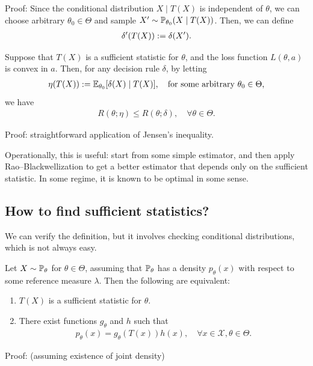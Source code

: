 \documentclass[11pt,letterpaper]{article}
\numberwithin{theorem}{lecture}
\numberwithin{proposition}{lecture}
\numberwithin{lemma}{lecture}
\numberwithin{claim}{lecture}
\numberwithin{corollary}{lecture}
\numberwithin{definition}{lecture}
\numberwithin{conjecture}{lecture}
\numberwithin{remark}{lecture}
\numberwithin{example}{lecture}
\numberwithin{equation}{lecture}
\begin{document}
Proof: Since the conditional distribution $X \mid T (X)$ is independent of $\theta$, we can choose arbitrary $\theta_0 \in \Theta$ and sample $X' \sim {\mathbb{P}}_{\theta_0} (X \mid T(X))$. Then, we can define
\begin{align*}
  \delta' (T(X)) := \delta (X').
\end{align*}
\begin{theorem}
  Suppose that $T(X)$ is a sufficient statistic for $\theta$, and the loss function $L(\theta, a)$ is convex in $a$. Then, for any decision rule $\delta$, by letting
  \begin{align*}
    \eta (T (X)) := {\mathbb{E}}_{\theta_0} [\delta (X) \mid T(X)], \quad \mbox{for some arbitrary } \theta_0 \in \Theta,
  \end{align*}
  we have
  \begin{align*}
    R(\theta; \eta) \leq R(\theta; \delta), \quad \forall \theta \in \Theta.
  \end{align*}
\end{theorem}
Proof: straightforward application of Jensen's inequality.

Operationally, this is useful: start from some simple estimator, and then apply Rao--Blackwell\-ization to get a better estimator that depends only on the sufficient statistic. In some regime, it is known to be optimal in some sense.

\subsection{How to find sufficient statistics?}
We can verify the definition, but it involves checking conditional distributions, which is not always easy.
\begin{theorem}
  Let $X \sim {\mathbb{P}}_\theta$ for $\theta \in \Theta$, assuming that ${\mathbb{P}}_\theta$ has a density $p_\theta(x)$ with respect to some reference measure $\lambda$. Then the following are equivalent:
  \begin{enumerate}
    \item $T(X)$ is a sufficient statistic for $\theta$.
    \item There exist functions $g_\theta$ and $h$ such that
    \begin{align*}
      p_\theta (x) = g_\theta (T(x)) h(x), \quad \forall x \in \mathcal{X}, \theta \in \Theta.
    \end{align*}
  \end{enumerate}
\end{theorem}
Proof: (assuming existence of joint density)
\end{document}
